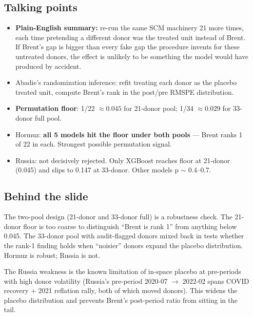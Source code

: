 \documentclass[11pt,a4paper]{article}
\newcommand{\highlight}[1]{\textcolor{accent}{\textbf{#1}}}
\begin{document}
\subsection{Talking points}
\begin{itemize}
  \item \highlight{Plain-English summary:} re-run the same SCM machinery 21 more times, each time pretending a different donor was the treated unit instead of Brent. If Brent's gap is bigger than every fake gap the procedure invents for these untreated donors, the effect is unlikely to be something the model would have produced by accident.
  \item Abadie's randomization inference: refit treating each donor as the placebo treated unit, compute Brent's rank in the post/pre RMSPE distribution.
  \item \highlight{Permutation floor}: 1/22 $\approx 0.045$ for 21-donor pool; 1/34 $\approx 0.029$ for 33-donor full pool.
  \item Hormuz: \highlight{all 5 models hit the floor under both pools} --- Brent ranks 1 of 22 in each. Strongest possible permutation signal.
  \item Russia: not decisively rejected. Only XGBoost reaches floor at 21-donor (0.045) and slips to 0.147 at 33-donor. Other models p $\sim$ 0.4--0.7.
\end{itemize}

\subsection{Behind the slide}
The two-pool design (21-donor and 33-donor full) is a robustness check. The 21-donor floor is too coarse to distinguish ``Brent is rank 1'' from anything below 0.045. The 33-donor pool with audit-flagged donors mixed back in tests whether the rank-1 finding holds when ``noisier'' donors expand the placebo distribution. Hormuz is robust; Russia is not.

The Russia weakness is the known limitation of in-space placebo at pre-periods with high donor volatility (Russia's pre-period 2020-07 $\to$ 2022-02 spans COVID recovery + 2021 reflation rally, both of which moved donors). This widens the placebo distribution and prevents Brent's post-period ratio from sitting in the tail.
\end{document}
